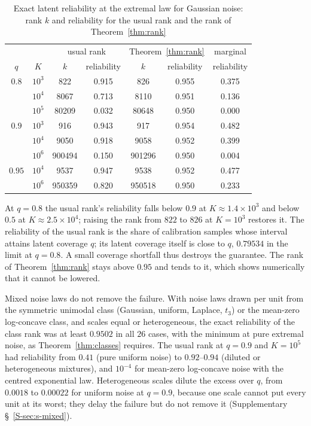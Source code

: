 \documentclass[12pt]{article}
\theoremstyle{definition}
\begin{document}
\begin{table}[htbp]
\renewcommand{\baselinestretch}{1}
\caption{Exact latent reliability at the extremal law for Gaussian noise: rank $k$ and reliability for the usual rank and the rank of Theorem~\ref{thm:rank}}
\label{tab:reliability}
\centering
\fontsize{9}{11pt}\selectfont
\begin{tabular}{ccccccc}
\toprule
& & \multicolumn{2}{c}{usual rank} & \multicolumn{2}{c}{Theorem~\ref{thm:rank}} & marginal \\
$q$ & $K$ & $k$ & reliability & $k$ & reliability & reliability \\
\midrule
$0.8$ & $10^3$ & 822 & 0.915 & 826 & 0.955 & 0.375 \\
 & $10^4$ & 8067 & 0.713 & 8110 & 0.951 & 0.136 \\
 & $10^5$ & 80209 & 0.032 & 80648 & 0.950 & 0.000 \\
$0.9$ & $10^3$ & 916 & 0.943 & 917 & 0.954 & 0.482 \\
 & $10^4$ & 9050 & 0.918 & 9058 & 0.952 & 0.399 \\
 & $10^6$ & 900494 & 0.150 & 901296 & 0.950 & 0.004 \\
$0.95$ & $10^4$ & 9537 & 0.947 & 9538 & 0.952 & 0.477 \\
 & $10^6$ & 950359 & 0.820 & 950518 & 0.950 & 0.233 \\
\bottomrule
\end{tabular}
\end{table}

At $q = 0.8$ the usual rank's reliability falls below $0.9$ at $K \approx 1.4 \times 10^3$ and below $0.5$ at $K \approx 2.5 \times 10^4$; raising the rank from $822$ to $826$ at $K = 10^3$ restores it. The reliability of the usual rank is the share of calibration samples whose interval attains latent coverage $q$; its latent coverage itself is close to $q$, $0.79534$ in the limit at $q = 0.8$. A small coverage shortfall thus destroys the guarantee. The rank of Theorem~\ref{thm:rank} stays above $0.95$ and tends to it, which shows numerically that it cannot be lowered.

Mixed noise laws do not remove the failure. With noise laws drawn per unit from the symmetric unimodal class (Gaussian, uniform, Laplace, $t_3$) or the mean-zero log-concave class, and scales equal or heterogeneous, the exact reliability of the class rank was at least $0.9502$ in all $26$ cases, with the minimum at pure extremal noise, as Theorem~\ref{thm:classes} requires. The usual rank at $q = 0.9$ and $K = 10^5$ had reliability from $0.41$ (pure uniform noise) to $0.92$--$0.94$ (diluted or heterogeneous mixtures), and $10^{-4}$ for mean-zero log-concave noise with the centred exponential law. Heterogeneous scales dilute the excess over $q$, from $0.0018$ to $0.00022$ for uniform noise at $q = 0.9$, because one scale cannot put every unit at its worst; they delay the failure but do not remove it (Supplementary \S~\ref{S-sec:s-mixed}).
\end{document}
